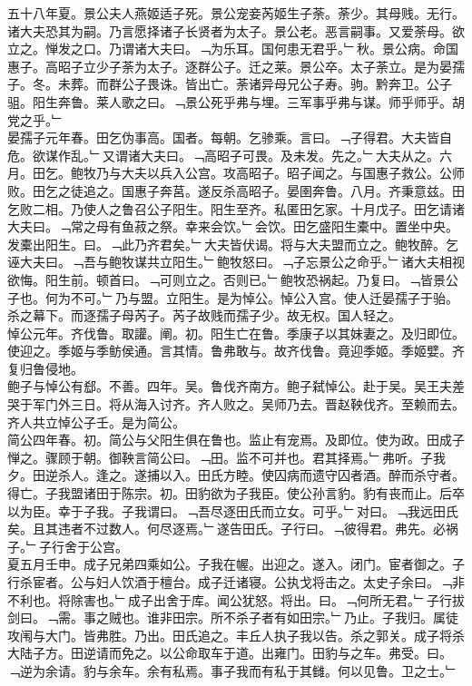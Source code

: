 \documentclass{zhvt-classic}
\begin{document}
\hspace*{2em}五十八年夏。景公夫人燕姬适子死。景公宠妾芮姬生子荼。荼少。其母贱。无行。诸大夫恐其为嗣。乃言愿择诸子长贤者为太子。景公老。恶言嗣事。又爱荼母。欲立之。惮发之口。乃谓诸大夫曰。﹁为乐耳。国何患无君乎。﹂秋。景公病。命国惠子。高昭子立少子荼为太子。逐群公子。迁之莱。景公卒。太子荼立。是为晏孺子。冬。未葬。而群公子畏诛。皆出亡。荼诸异母兄公子寿。驹。黔奔卫。公子驵。阳生奔鲁。莱人歌之曰。﹁景公死乎弗与埋。三军事乎弗与谋。师乎师乎。胡党之乎。﹂\\
\hspace*{2em}晏孺子元年春。田乞伪事高。国者。每朝。乞骖乘。言曰。﹁子得君。大夫皆自危。欲谋作乱。﹂又谓诸大夫曰。﹁高昭子可畏。及未发。先之。﹂大夫从之。六月。田乞。鲍牧乃与大夫以兵入公宫。攻高昭子。昭子闻之。与国惠子救公。公师败。田乞之徒追之。国惠子奔莒。遂反杀高昭子。晏圉奔鲁。八月。齐秉意兹。田乞败二相。乃使人之鲁召公子阳生。阳生至齐。私匿田乞家。十月戊子。田乞请诸大夫曰。﹁常之母有鱼菽之祭。幸来会饮。﹂会饮。田乞盛阳生橐中。置坐中央。发橐出阳生。曰。﹁此乃齐君矣。﹂大夫皆伏谒。将与大夫盟而立之。鲍牧醉。乞诬大夫曰。﹁吾与鲍牧谋共立阳生。﹂鲍牧怒曰。﹁子忘景公之命乎。﹂诸大夫相视欲悔。阳生前。顿首曰。﹁可则立之。否则已。﹂鲍牧恐祸起。乃复曰。﹁皆景公子也。何为不可。﹂乃与盟。立阳生。是为悼公。悼公入宫。使人迁晏孺子于骀。杀之幕下。而逐孺子母芮子。芮子故贱而孺子少。故无权。国人轻之。\\
\hspace*{2em}悼公元年。齐伐鲁。取讙。阐。初。阳生亡在鲁。季康子以其妹妻之。及归即位。使迎之。季姬与季鲂侯通。言其情。鲁弗敢与。故齐伐鲁。竟迎季姬。季姬嬖。齐复归鲁侵地。\\
\hspace*{2em}鲍子与悼公有郄。不善。四年。吴。鲁伐齐南方。鲍子弑悼公。赴于吴。吴王夫差哭于军门外三日。将从海入讨齐。齐人败之。吴师乃去。晋赵鞅伐齐。至赖而去。齐人共立悼公子壬。是为简公。\\
\hspace*{2em}简公四年春。初。简公与父阳生俱在鲁也。监止有宠焉。及即位。使为政。田成子惮之。骤顾于朝。御鞅言简公曰。﹁田。监不可并也。君其择焉。﹂弗听。子我夕。田逆杀人。逢之。遂捕以入。田氏方睦。使囚病而遗守囚者酒。醉而杀守者。得亡。子我盟诸田于陈宗。初。田豹欲为子我臣。使公孙言豹。豹有丧而止。后卒以为臣。幸于子我。子我谓曰。﹁吾尽逐田氏而立女。可乎。﹂对曰。﹁我远田氏矣。且其违者不过数人。何尽逐焉。﹂遂告田氏。子行曰。﹁彼得君。弗先。必祸子。﹂子行舍于公宫。\\
\hspace*{2em}夏五月壬申。成子兄弟四乘如公。子我在幄。出迎之。遂入。闭门。宦者御之。子行杀宦者。公与妇人饮酒于檀台。成子迁诸寝。公执戈将击之。太史子余曰。﹁非不利也。将除害也。﹂成子出舍于库。闻公犹怒。将出。曰。﹁何所无君。﹂子行拔剑曰。﹁需。事之贼也。谁非田宗。所不杀子者有如田宗。﹂乃止。子我归。属徒攻闱与大门。皆弗胜。乃出。田氏追之。丰丘人执子我以告。杀之郭关。成子将杀大陆子方。田逆请而免之。以公命取车于道。出雍门。田豹与之车。弗受。曰。﹁逆为余请。豹与余车。余有私焉。事子我而有私于其雠。何以见鲁。卫之士。﹂\\
\end{document}
